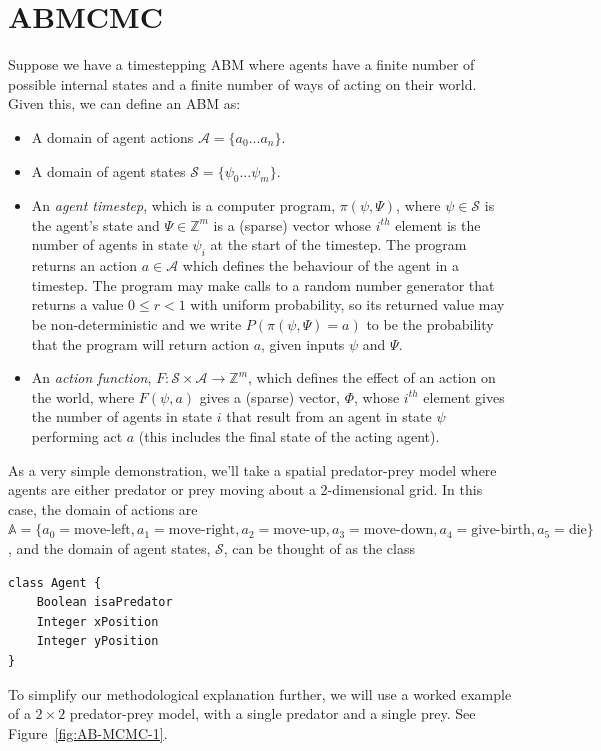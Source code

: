 \section{ABMCMC}


Suppose we have a timestepping ABM where agents have a finite number of possible internal states and a finite number of ways of acting on their world. Given this, we can define an ABM as:
\begin{itemize}
\item A domain of agent actions $\mathcal{A} =\{ a_0 ... a_n \}$.

\item A domain of agent states $\mathcal{S} = \{\psi_0 ... \psi_m\}$.

\item An \textit{agent timestep}, which is a computer program, $\pi(\psi,\Psi)$, where $\psi \in \mathcal{S}$ is the agent's state and $\Psi \in \mathbb{Z}^m$ is a (sparse) vector whose $i^{th}$ element is the number of agents in state $\psi_i$ at the start of the timestep. The program returns an action $a \in \mathcal{A}$ which defines the behaviour of the agent in a timestep. The program may make calls to a random number generator that returns a value $0 \le r < 1$ with uniform probability, so its returned value may be non-deterministic and we write $P(\pi(\psi,\Psi)=a)$ to be the probability that the program will return action $a$, given inputs $\psi$ and $\Psi$. 

\item An \textit{action function}, $F: \mathcal{S} \times \mathcal{A} \to \mathbb{Z}^m$, which defines the effect of an action on the world, where $F(\psi, a)$ gives a (sparse) vector, $\Phi$, whose $i^{th}$ element gives the number of agents in state $i$ that result from an agent in state $\psi$ performing act $a$ (this includes the final state of the acting agent).
\end{itemize}

As a very simple demonstration, we'll take a spatial predator-prey model where agents are either predator or prey moving about a 2-dimensional grid. In this case, the domain of actions are $\mathbb{A} = \{ a_0=\textrm{move-left}, a_1=\textrm{move-right}, a_2=\textrm{move-up}, a_3=\textrm{move-down}, a_4=\textrm{give-birth}, a_5=\textrm{die}\}$, and the domain of agent states, $\mathcal{S}$, can be thought of as the class 
\begin{lstlisting}
class Agent {
	Boolean	isaPredator
	Integer	xPosition
	Integer	yPosition
}
\end{lstlisting}
To simplify our methodological explanation further, we will use a worked example of a $2\times2$ predator-prey model, with a single predator and a single prey. See Figure~\ref{fig:AB-MCMC-1}.

